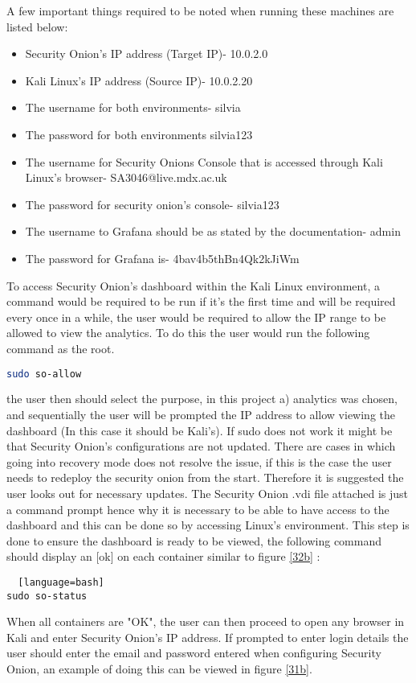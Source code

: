 \documentclass[12pt]{article}
\begin{document}
A few important things required to be noted when running these machines are listed below:
\begin{itemize}
\item Security Onion's IP address (Target IP)- 10.0.2.0
\item Kali Linux's IP address (Source IP)- 10.0.2.20
\item The username for both environments- silvia 
\item The password for both environments silvia123
\item The username for Security Onions Console that is accessed through Kali Linux's browser- SA3046@live.mdx.ac.uk
\item The password for security onion's console- silvia123 
\item The username to Grafana should be as stated by the documentation- admin
\item The password for Grafana is- 4bav4b5thBn4Qk2kJiWm
\end{itemize}

To access Security Onion's dashboard within the Kali Linux environment, a command would be required to be run if it's the first time and will be required every once in a while, the user would be required to allow the IP range to be allowed to view the analytics. To do this the user would run the following command as the root.



\begin{lstlisting}[language=bash]
sudo so-allow
\end{lstlisting}

the user then should select the purpose, in this project a) analytics was chosen, and sequentially the user will be prompted the IP address to allow viewing the dashboard (In this case it should be Kali's). If sudo does not work it might be that Security Onion's configurations are not updated. There are cases in which going into recovery mode does not resolve the issue, if this is the case the user needs to redeploy the security onion from the start. Therefore it is suggested the user looks out for necessary updates. The Security Onion .vdi file attached is just a command prompt hence why it is necessary to be able to have access to the dashboard and this can be done so by accessing Linux's environment. This step is done to ensure the dashboard is ready to be viewed, the following command should display an [ok] on each container similar to figure \ref{32b} :
\begin{lstlisting}  [language=bash]
sudo so-status
\end{lstlisting}
When all containers are "OK", the user can then proceed to open any browser in Kali and enter Security Onion's IP address. If prompted to enter login details the user should enter the email and password entered when configuring Security Onion, an example of doing this can be viewed in figure \ref{31b}.
\end{document}
